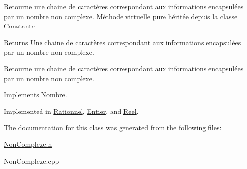 \-Retourne une chaine de caractères correspondant aux informations encapsulées par un nombre non complexe. \-Méthode virtuelle pure héritée depuis la classe \hyperlink{classConstante}{\-Constante}. 

\begin{DoxyReturn}{\-Returns}
\-Une chaine de caractères correspondant aux informations encapsulées par un nombre non complexe.
\end{DoxyReturn}
\-Retourne une chaine de caractères correspondant aux informations encapsulées par un nombre non complexe. 

\-Implements \hyperlink{classNombre_a8df232159bfd0e9f7e153cc73c8b128c}{\-Nombre}.



\-Implemented in \hyperlink{classRationnel_a41bc89d21ce161818f67ccfe296766c0}{\-Rationnel}, \hyperlink{classEntier_aa960356dfeae8af6dfa2cd25136a1a6f}{\-Entier}, and \hyperlink{classReel_a990e8324822ba3dbc64fc7ff727411e2}{\-Reel}.



\-The documentation for this class was generated from the following files\-:\begin{DoxyCompactItemize}
\item 
\hyperlink{NonComplexe_8h}{\-Non\-Complexe.\-h}\item 
\-Non\-Complexe.\-cpp\end{DoxyCompactItemize}
